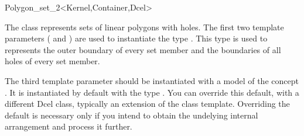 \ccRefPageBegin

\begin{ccRefClass}{Polygon_set_2<Kernel,Container,Dcel>}

\ccThreeToTwo
    
\ccDefinition

The class \ccRefName{} represents sets of linear polygons with holes.
The first two template parameters ( and ) 
are used to instantiate the type . 
This type is used to represents the outer boundary of every set member
and the boundaries of all holes of every set member.

The third template parameter  should be instantiated with a
model of the concept . It is instantiated
by default with the type . You can override 
this default, with a different {\sc Dcel} class, typically an extension
of the  class template. Overriding the default is 
necessary only if you intend to obtain the undelying internal arrangement 
and process it further.


\ccInheritsFrom

\ccSeeAlso
  \\

\end{ccRefClass}
\ccRefPageEnd
